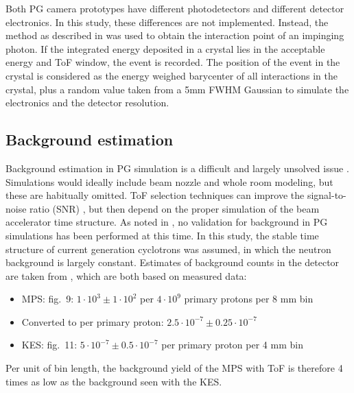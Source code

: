 \documentclass[a4paper,english]{article}
\begin{document}
Both PG camera prototypes have different photodetectors and different detector electronics. In this study, these differences are not implemented. Instead, the method as described in \cite{Gueth2013} was used to obtain the interaction point of an impinging photon. If the integrated energy deposited in a crystal lies in the acceptable energy and ToF window, the event is recorded. The position of the event in the crystal is considered as the energy weighed barycenter of all interactions in the crystal, plus a random value taken from a 5mm FWHM Gaussian to simulate the electronics and the detector resolution.

\subsection{Background estimation}

Background estimation in PG simulation is a difficult and largely unsolved issue \citep{Huisman2016,Sterpin2015,Pinto2014a,Perali2014}. Simulations would ideally include beam nozzle and whole room modeling, but these are habitually omitted. ToF selection techniques can improve the signal-to-noise ratio (SNR) \citep{Testa2008}, but then depend on the proper simulation of the beam accelerator time structure. As noted in \cite{Huisman2016}, no validation for background in PG simulations has been performed at this time. In this study, the stable time structure of current generation cyclotrons was assumed, in which the neutron background is largely constant. Estimates of background counts in the detector are taken from \cite{Pinto2014a,Perali2014}, which are both based on measured data:

\begin{itemize}[noitemsep]
\item MPS: \cite{Pinto2014a} fig.~9: $1 \cdot 10^{3} \pm 1 \cdot 10^{2}$ per $4\cdot10^9$ primary protons per 8 mm bin
\item[] Converted to per primary proton: $2.5 \cdot 10^{-7} \pm 0.25 \cdot 10^{-7}$
\item KES: \cite{Perali2014} fig.~11: $5 \cdot 10^{-7} \pm 0.5 \cdot 10^{-7}$ per primary proton per 4 mm bin
\end{itemize}

Per unit of bin length, the background yield of the MPS with ToF is therefore 4 times as low as the background seen with the KES.


\end{document}
